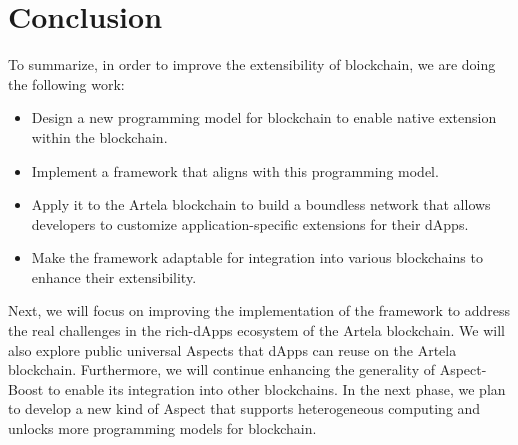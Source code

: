 \section{Conclusion}

To summarize, in order to improve the extensibility of blockchain, we are doing the following work:

\begin{itemize}
  \item Design a new programming model for blockchain to enable native extension within the blockchain.
  \item Implement a framework that aligns with this programming model.
  \item Apply it to the Artela blockchain to build a boundless network that allows developers to customize application-specific extensions for their dApps.
  \item Make the framework adaptable for integration into various blockchains to enhance their extensibility.
\end{itemize}

Next, we will focus on improving the implementation of the framework to address the real challenges in the rich-dApps ecosystem of the Artela blockchain. We will also explore public universal Aspects that dApps can reuse on the Artela blockchain. Furthermore, we will continue enhancing the generality of Aspect-Boost to enable its integration into other blockchains. In the next phase, we plan to develop a new kind of Aspect that supports heterogeneous computing and unlocks more programming models for blockchain.

